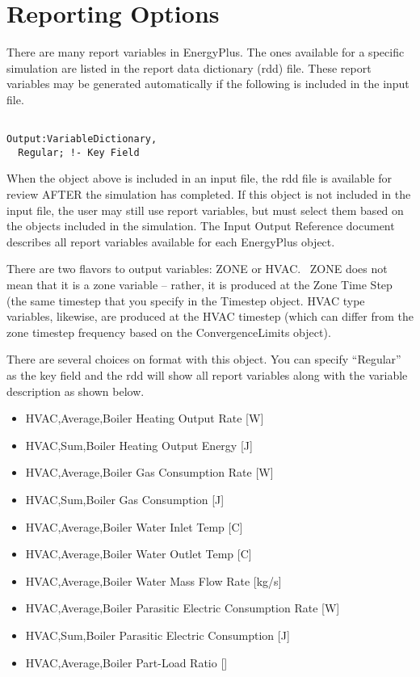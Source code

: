 \section{Reporting Options}\label{reporting-options}

There are many report variables in EnergyPlus. The ones available for a specific simulation are listed in the report data dictionary (rdd) file. These report variables may be generated automatically if the following is included in the input file.

\begin{lstlisting}

Output:VariableDictionary,
  Regular; !- Key Field
\end{lstlisting}

When the object above is included in an input file, the rdd file is available for review AFTER the simulation has completed. If this object is not included in the input file, the user may still use report variables, but must select them based on the objects included in the simulation. The Input Output Reference document describes all report variables available for each EnergyPlus object.

There are two flavors to output variables: ZONE or HVAC.~ ZONE does not mean that it is a zone variable -- rather, it is produced at the Zone Time Step (the same timestep that you specify in the Timestep object. HVAC type variables, likewise, are produced at the HVAC timestep (which can differ from the zone timestep frequency based on the ConvergenceLimits object).

There are several choices on format with this object. You can specify ``Regular'' as the key field and the rdd will show all report variables along with the variable description as shown below.

\begin{itemize}
\tightlist
\item
  HVAC,Average,Boiler Heating Output Rate {[}W{]}
\item
  HVAC,Sum,Boiler Heating Output Energy {[}J{]}
\item
  HVAC,Average,Boiler Gas Consumption Rate {[}W{]}
\item
  HVAC,Sum,Boiler Gas Consumption {[}J{]}
\item
  HVAC,Average,Boiler Water Inlet Temp {[}C{]}
\item
  HVAC,Average,Boiler Water Outlet Temp {[}C{]}
\item
  HVAC,Average,Boiler Water Mass Flow Rate {[}kg/s{]}
\item
  HVAC,Average,Boiler Parasitic Electric Consumption Rate {[}W{]}
\item
  HVAC,Sum,Boiler Parasitic Electric Consumption {[}J{]}
\item
  HVAC,Average,Boiler Part-Load Ratio {[}{]}
\end{itemize}

